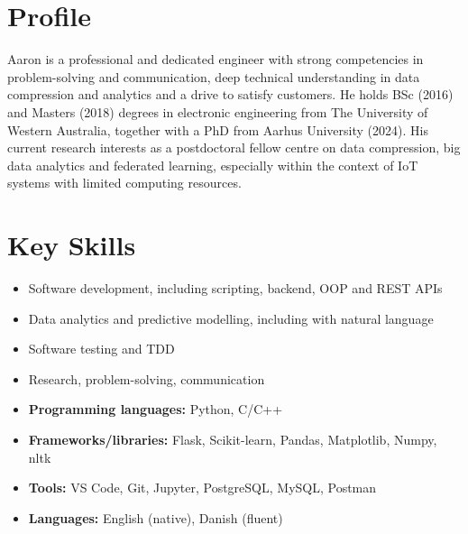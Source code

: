 \documentclass[a4paper,11pt]{article}
\begin{document}






\section{Profile}\vspace{-0.3em}

\noindent
Aaron is a professional and dedicated engineer with strong competencies in problem-solving and communication, deep technical understanding in data compression and analytics and a drive to satisfy customers.
He holds BSc (2016) and Masters (2018) degrees in electronic engineering from The University of Western Australia, together with a PhD from Aarhus University (2024).
His current research interests as a postdoctoral fellow centre on data compression, big data analytics and federated learning, especially within the context of IoT systems with limited computing resources.




\section{Key Skills}\vspace{-1.3em}

\begin{multicols}{2}
    \begin{itemize}[topsep=0pt,itemsep=-0.3em]
        \item Software development, including scripting, backend, OOP and REST APIs
        \item Data analytics and predictive modelling, including with natural language
        \item Software testing and TDD
        \item Research, problem-solving, communication

        \item \textbf{Programming languages:} Python, C/C++
        \item \textbf{Frameworks/libraries:} Flask, Scikit-learn, Pandas, Matplotlib, Numpy, nltk
        \item \textbf{Tools:} VS Code, Git, Jupyter, PostgreSQL, MySQL, Postman
        \item \textbf{Languages:} English (native), Danish (fluent)
    \end{itemize}
\end{multicols}
\vspace{-0.7em}
\end{document}
